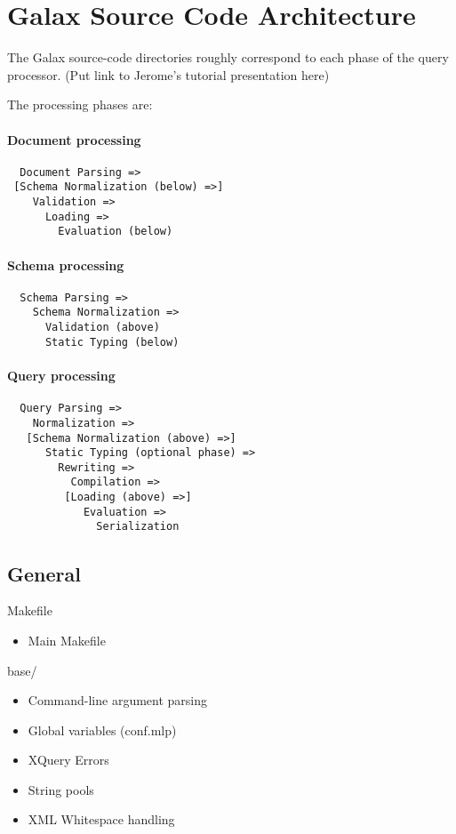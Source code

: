 \section{Galax Source Code Architecture}

The Galax source-code directories roughly correspond to each phase of
the query processor. (Put link to Jerome's tutorial presentation here)
  
The processing phases are: 

\paragraph{Document processing}
\begin{verbatim}
  Document Parsing =>  
 [Schema Normalization (below) =>]
    Validation => 
      Loading => 
        Evaluation (below)
\end{verbatim}

\paragraph{Schema processing}
\begin{verbatim}
  Schema Parsing => 
    Schema Normalization =>
      Validation (above)
      Static Typing (below)
\end{verbatim}

\paragraph{Query processing}
\begin{verbatim}
  Query Parsing => 
    Normalization => 
   [Schema Normalization (above) =>]
      Static Typing (optional phase) => 
        Rewriting => 
          Compilation => 
         [Loading (above) =>]
            Evaluation =>
              Serialization 
\end{verbatim}

\subsection{General}
Makefile
\begin{itemize}
\item  Main Makefile 
\end{itemize}

base/
\begin{itemize}
\item    Command-line argument parsing
\item    Global variables (conf.mlp)
\item    XQuery Errors
\item    String pools 
\item    XML Whitespace handling
\end{itemize}

